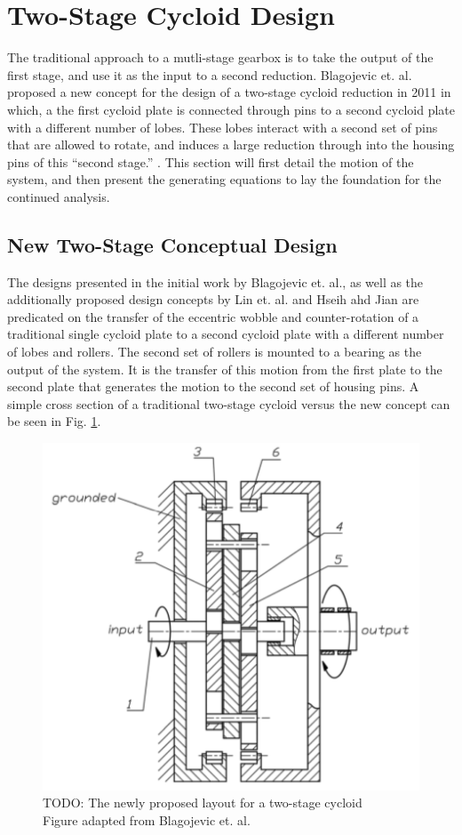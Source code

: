 \section{Two-Stage Cycloid Design} \label{ch:dual:initial_equations}

The traditional approach to a mutli-stage gearbox is to take the output of the first stage, and use it as the input to a second reduction. Blagojevic et. al. proposed a new concept for the design of a two-stage cycloid reduction in 2011 in which, a the first cycloid plate is connected through pins to a second cycloid plate with a different number of lobes. These lobes interact with a second set of pins that are allowed to rotate, and induces a large reduction through into the housing pins of this ``second stage.'' \cite{ref:new_two_stage}. This section will first detail the motion of the system, and then present the generating equations to lay the foundation for the continued analysis. 

\subsection{New Two-Stage Conceptual Design} \label{ch:dual:initial_equation:motion}

The designs presented in the initial work by Blagojevic et. al., as well as the additionally proposed design concepts by Lin et. al. \cite{ref:two_stage_tooth_mod} and Hseih ahd Jian \cite{ref:hsieh_effect_2016} are predicated on the transfer of the eccentric wobble and counter-rotation of a traditional single cycloid plate to a second cycloid plate with a different number of lobes and rollers. The second set of rollers is mounted to a bearing as the output of the system. It is the transfer of this motion from the first plate to the second plate that generates the motion to the second set of housing pins. A simple cross section of a traditional two-stage cycloid versus the new concept can be seen in Fig. \ref{fig:two_stage_simple_cross}. 

\begin{figure}[h]
	\centering
	\includegraphics[width=0.48\linewidth]{fig/new_layout_TODO}
   \caption{TODO: The newly proposed layout for a two-stage cycloid
   \\ Figure adapted from Blagojevic et. al. \cite{ref:new_two_stage}}
   \label{fig:two_stage_simple_cross}
\end{figure}

